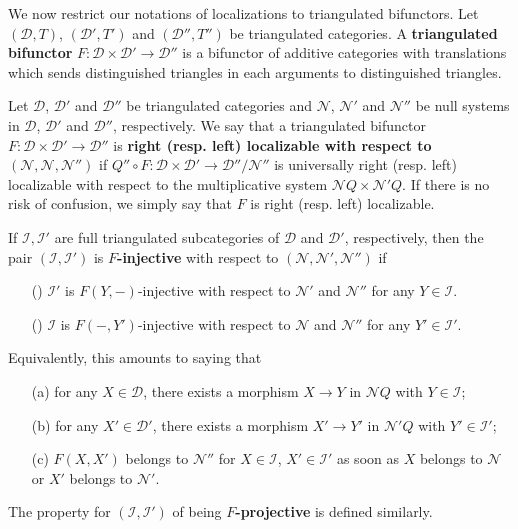 We now restrict our notations of localizations to triangulated bifunctors. Let $(\mathcal{D},T)$, $(\mathcal{D}',T')$ and $(\mathcal{D}'',T'')$ be triangulated categories. A \textbf{triangulated bifunctor} $F:\mathcal{D}\times\mathcal{D}'\to\mathcal{D}''$ is a bifunctor of additive categories with translations which sends distinguished triangles in each arguments to distinguished triangles.

\begin{definition}
Let $\mathcal{D}$, $\mathcal{D}'$ and $\mathcal{D}''$ be triangulated categories and $\mathcal{N}$, $\mathcal{N}'$ and $\mathcal{N}''$ be null systems in $\mathcal{D}$, $\mathcal{D}'$ and $\mathcal{D}''$, respectively. We say that a triangulated bifunctor $F:\mathcal{D}\times\mathcal{D}'\to\mathcal{D}''$ is \textbf{right (resp. left) localizable with respect to $(\mathcal{N},\mathcal{N},\mathcal{N}'')$} if $Q''\circ F:\mathcal{D}\times\mathcal{D}'\to\mathcal{D}''/\mathcal{N}''$ is universally right (resp. left) localizable with respect to the multiplicative system $\mathcal{N}Q\times\mathcal{N}'Q$. If there is no risk of confusion, we simply say that $F$ is right (resp. left) localizable.\par
If $\mathcal{I},\mathcal{I}'$ are full triangulated subcategories of $\mathcal{D}$ and $\mathcal{D}'$, respectively, then the pair $(\mathcal{I},\mathcal{I}')$ is \textbf{$F$-injective} with respect to $(\mathcal{N},\mathcal{N}',\mathcal{N}'')$ if
\begin{enumerate}
    \item[(\rmnum{1})] $\mathcal{I}'$ is $F(Y,-)$-injective with respect to $\mathcal{N}'$ and $\mathcal{N}''$ for any $Y\in\mathcal{I}$.
    \item[(\rmnum{2})] $\mathcal{I}$ is $F(-,Y')$-injective with respect to $\mathcal{N}$ and $\mathcal{N}''$ for any $Y'\in\mathcal{I}'$.
\end{enumerate}
Equivalently, this amounts to saying that
\begin{enumerate}
    \item[(a)] for any $X\in\mathcal{D}$, there exists a morphism $X\to Y$ in $\mathcal{N}Q$ with $Y\in\mathcal{I}$;
    \item[(b)] for any $X'\in\mathcal{D}'$, there exists a morphism $X'\to Y'$ in $\mathcal{N}'Q$ with $Y'\in\mathcal{I}'$;
    \item[(c)] $F(X,X')$ belongs to $\mathcal{N}''$ for $X\in\mathcal{I}$, $X'\in\mathcal{I}'$ as soon as $X$ belongs to $\mathcal{N}$ or $X'$ belongs to $\mathcal{N}'$.
\end{enumerate}
The property for $(\mathcal{I},\mathcal{I}')$ of being \textbf{$F$-projective} is defined similarly.
\end{definition}

